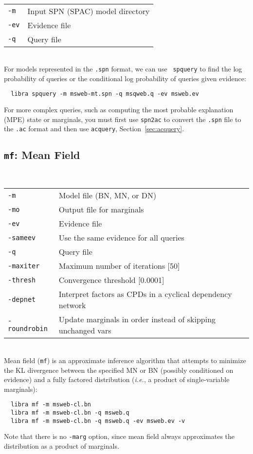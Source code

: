 \documentclass[11pt]{article}
\begin{document}
\noindent {} \\
\begin{tabular}{ll}
{\tt -m} &      Input SPN (SPAC) model directory \\
{\tt -ev} &     Evidence file \\
{\tt -q} &      Query file \\
\end{tabular} \\

For models represented in the {\tt .spn} format, we can use {\tt
spquery} to find the log probability of queries or the conditional log
probability of queries given evidence:
\begin{verbatim}
  libra spquery -m msweb-mt.spn -q msqweb.q -ev msweb.ev
\end{verbatim}

For more complex queries, such as computing the most probable
explanation (MPE) state or marginals, you must first use {\tt spn2ac}
to convert the {\tt .spn} file to the {\tt .ac} format and then use
{\tt acquery}, Section~\ref{sec:acquery}.


\subsection{{\tt mf}: Mean Field} \label{sec:mf}

\noindent {} \\
\begin{tabular}{ll}
{\tt -m} &           Model file (BN, MN, or DN) \\
{\tt -mo} &          Output file for marginals \\
{\tt -ev} &          Evidence file \\
{\tt -sameev} &      Use the same evidence for all queries \\
{\tt -q} &           Query file \\
{\tt -maxiter} &     Maximum number of iterations [50] \\
{\tt -thresh} &      Convergence threshold [0.0001] \\
{\tt -depnet} &      Interpret factors as CPDs in a cyclical dependency network \\
{\tt -roundrobin} &  Update marginals in order instead of skipping unchanged vars \\
\end{tabular} \\

Mean field ({\tt mf}) is an approximate inference algorithm that
attempts to minimize the KL divergence between the specified
MN or BN (possibly conditioned on evidence) and a fully factored
distribution ({\em i.e.}, a product of single-variable marginals):
\begin{verbatim}
  libra mf -m msweb-cl.bn
  libra mf -m msweb-cl.bn -q msweb.q
  libra mf -m msweb-cl.bn -q msweb.q -ev msweb.ev -v
\end{verbatim}
Note that there is no {\tt -marg} option, since mean field always
approximates the distribution as a product of marginals.
\end{document}
